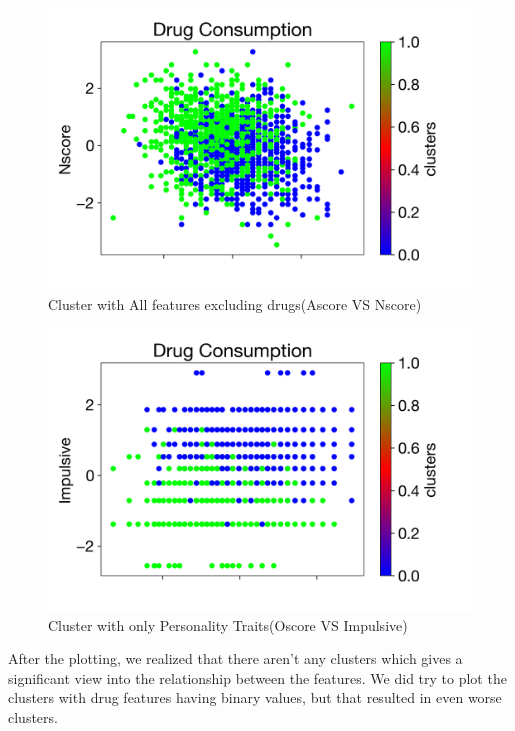 \documentclass[10pt]{article}
\begin{document}
\begin{figure}[H]
\caption{Cluster with All features excluding drugs(Ascore VS Nscore) }
\label{fig:AscoreVSNscore}
\centering
\includegraphics[scale=0.35]{cluster5-AscoreVsNscore.png}
\end{figure}

\begin{figure}[H]
\caption{Cluster with only Personality Traits(Oscore VS Impulsive) }
\label{fig:OscoreVSImpulsive}
\centering
\includegraphics[scale=0.35]{cluster6-OscoreVImpulsive.png}
\end{figure}

    After the plotting, we realized that there aren't any clusters which gives a significant view into the relationship between the features. We did try to plot the clusters with drug features having binary values, but that resulted in even worse clusters. 
    
\end{document}
